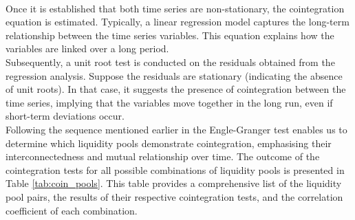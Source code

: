 \\[3mm]
Once it is established that both time series are non-stationary, the cointegration equation is estimated. Typically, a linear regression model captures the long-term relationship between the time series variables. This equation explains how the variables are linked over a long period.
\\[3mm]
Subsequently, a unit root test is conducted on the residuals obtained from the regression analysis. Suppose the residuals are stationary (indicating the absence of unit roots). In that case, it suggests the presence of cointegration between the time series, implying that the variables move together in the long run, even if short-term deviations occur.
\\[3mm]
Following the sequence mentioned earlier in the Engle-Granger test enables us to determine which liquidity pools demonstrate cointegration, emphasising their interconnectedness and mutual relationship over time. The outcome of the cointegration tests for all possible combinations of liquidity pools is presented in Table \ref{tab:coin_pools}. This table provides a comprehensive list of the liquidity pool pairs, the results of their respective cointegration tests, and the correlation coefficient of each combination.
